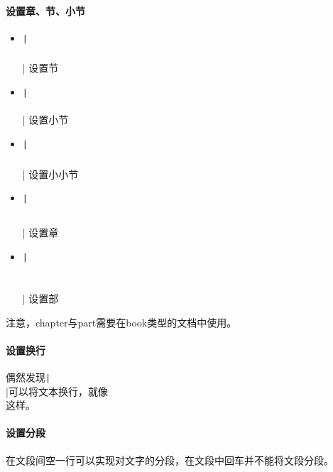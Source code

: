 \documentclass[fontset=ubuntu]{ctexart}
\begin{document}
\subsection{设置章、节、小节}
\begin{itemize}
    \item \texttt|\section{}| 设置节
    \item \texttt|\subsection{}| 设置小节
    \item \texttt|\subsubsection{}| 设置小小节
    \item \texttt|\chapter{}| 设置章
    \item \texttt|\part{}| 设置部
\end{itemize}

注意，chapter与part需要在book类型的文档中使用。

\subsection{设置换行}
偶然发现\texttt|\\|可以将文本换行，就像\\这样。

\subsection{设置分段}
在文段间空一行可以实现对文字的分段，在文段中回车并不能将文段分段。
\end{document}
